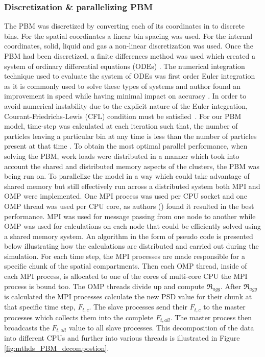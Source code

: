 \documentclass[preprint,11pt,authoryear]{elsarticle}
\begin{document}
\subsubsection{Discretization \& parallelizing PBM}
 The PBM was discretized by converting each of its coordinates in to discrete bins. For the spatial 
coordinates a linear bin spacing was used. For the internal coordinates, solid, liquid and gas a 
non-linear discretization was used.
 Once the PBM had been discretized, a finite differences method was 
used which created a system of ordinary differential equations (ODEs) \citep{Barrasso2015cerd}. The 
numerical integration technique used to evaluate the system of ODEs was first order Euler integration 
as it is commonly used to solve these types of systems and author found an improvement in  speed while 
having minimal impact on accuracy \citep{Barrasso2013}. In order to avoid numerical instability due to the explicit nature of the Euler integration, Courant-Friedrichs-Lewis (CFL) condition must be satisfied~\citep{courant1967}. For our PBM model, time-step was calculated at each iteration such that, the number of particles leaving a particular bin at any time is less than the number of particles present at that time \citep{Ramachandran2010}. To obtain the most optimal parallel 
performance, when solving the PBM, work loads were distributed in a manner which took into account 
the shared and distributed memory aspects of the clusters, the PBM was being run on. To 
parallelize the model in a way which could take advantage of shared memory but still effectively run 
across a distributed system both MPI and OMP were implemented. 
 One MPI process was used per CPU socket and one OMP thread was used per CPU core, as 
authors (\cite{Bettencourt2017}) found it resulted in the best performance. MPI was used for message 
passing from one node to another while OMP was used for calculations on each node that could be 
efficiently solved using a shared memory system. 
 An algorithm in the form of pseudo code is presented below illustrating how the calculations are distributed and carried out 
during the simulation. For each time step, the MPI processes are made responsible for a specific chunk 
of the spatial compartments. Then each OMP thread, inside of each MPI process, is allocated to one of 
the cores of multi-core CPU the MPI process is bound too. The OMP threads divide up and 
compute $\Re_{agg}$. After $\Re_{agg}$ is calculated the MPI 
processes calculate the new PSD value for their chunk at that specific time step, $F_{t,c}$. The slave 
processes send their $F_{t,c}$ to the master processes which collects them into the complete 
$F_{t,all}$. The master process then broadcasts the $F_{t,all}$ value to all slave processes. This 
decomposition of the data into different CPUs and further into various threads is illustrated in Figure 
\ref{fig:mthds_PBM_decompostion}.	
\end{document}
